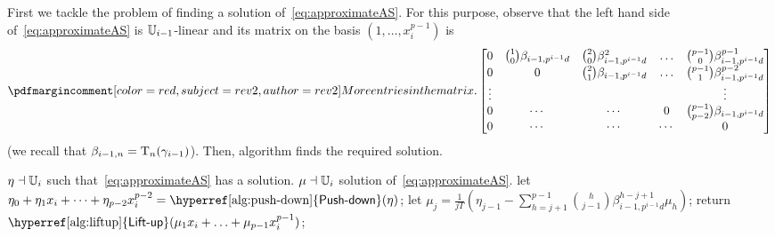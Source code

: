 First we tackle the problem of finding a solution
of~\eqref{eq:approximateAS}.  For this purpose, observe that the left
hand side of~\eqref{eq:approximateAS} is $\mathbb{U}_{i-1}$-linear and its
matrix on the basis $(1,\ldots,x_i^{p-1})$ is
\begin{equation}
  \pdfmctwo{More entries in the matrix.}
  \label{eq:approximate-matrix}
  \begin{bmatrix}
    0 & \binom{1}{0}\beta_{i-1,p^{i-1}d} & \binom{2}{0}\beta_{i-1,p^{i-1}d}^2 & \hdots & \binom{p-1}{0}\beta_{i-1,p^{i-1}d}^{p-1} \\
    0 & 0 & \binom{2}{1}\beta_{i-1,p^{i-1}d} & \hdots & \binom{p-1}{1}\beta_{i-1,p^{i-1}d}^{p-2}\\
    \vdots  &&         &        & \vdots               \\
    0 & \cdots & \cdots  & 0      &\binom{p-1}{p-2}\beta_{i-1,p^{i-1}d} \\
    0 & \cdots & \cdots  & \cdots & 0
  \end{bmatrix}
\end{equation}
(we recall that $\beta_{i-1,n}=\operatorname{T}_{n}(\gamma_{i-1})$).  Then,
algorithm \hyperref[alg:approximateas]{} finds the required solution.




\begin{algorithm}
  \caption{\label{alg:approximateas}} 
  \begin{algorithmic}[1]
    \REQUIRE $\eta\dashv\mathbb{U}_i$ such that~\eqref{eq:approximateAS} has a solution.
    \ENSURE $\mu\dashv\mathbb{U}_i$ solution of~\eqref{eq:approximateAS}.
    \STATE let $\eta_0 + \eta_1 x_i + \dots + \eta_{p-2} x_i^{p-2}=\text{\hyperref[alg:push-down]{\alg{Push-down}}}(\eta)$;
    \STATE let $\mu_j =
   \frac{1}{jT}\left(\eta_{j-1} -
     \sum_{h=j+1}^{p-1}\binom{h}{j-1}\beta_{i-1,p^{i-1}d}^{h-j+1}\mu_h\right)$;
   \ENDFOR
   \STATE return $\text{\hyperref[alg:liftup]{\alg{Lift-up}}}(\mu_1 x_i + \ldots + \mu_{p-1} x_i^{p-1})$;
\end{algorithmic}
\end{algorithm}

